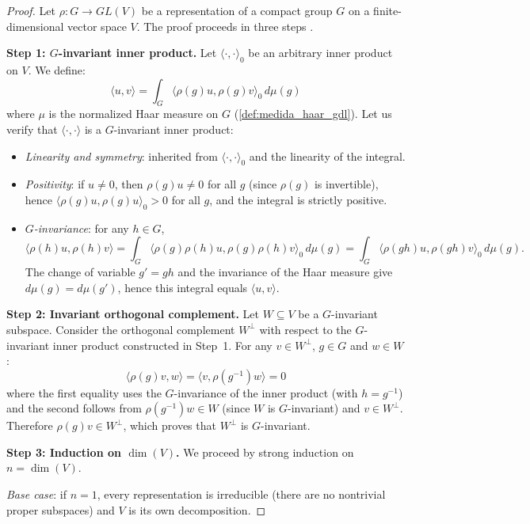 \begin{proof}
Let $\rho: G \rightarrow GL(V)$ be a representation of a compact group $G$ on a finite-dimensional vector space $V$. The proof proceeds in three steps \citep{Fulton1991}.

\textbf{Step 1: $G$-invariant inner product.}
Let $\langle \cdot, \cdot \rangle_0$ be an arbitrary inner product on $V$. We define:
\begin{equation}\label{eq:producto_invariante}
\langle u, v \rangle = \int_G \langle \rho(g)u, \rho(g)v \rangle_0 \, d\mu(g)
\end{equation}
where $\mu$ is the normalized Haar measure on $G$ (\autoref{def:medida_haar_gdl}). Let us verify that $\langle \cdot, \cdot \rangle$ is a $G$-invariant inner product:
\begin{itemize}
    \item \textit{Linearity and symmetry}: inherited from $\langle \cdot, \cdot \rangle_0$ and the linearity of the integral.
    \item \textit{Positivity}: if $u \neq 0$, then $\rho(g)u \neq 0$ for all $g$ (since $\rho(g)$ is invertible), hence $\langle \rho(g)u, \rho(g)u \rangle_0 > 0$ for all $g$, and the integral is strictly positive.
    \item \textit{$G$-invariance}: for any $h \in G$,
    \[
    \langle \rho(h)u, \rho(h)v \rangle = \int_G \langle \rho(g)\rho(h)u, \rho(g)\rho(h)v \rangle_0 \, d\mu(g) = \int_G \langle \rho(gh)u, \rho(gh)v \rangle_0 \, d\mu(g).
    \]
    The change of variable $g' = gh$ and the invariance of the Haar measure give $d\mu(g) = d\mu(g')$, hence this integral equals $\langle u, v \rangle$.
\end{itemize}

\textbf{Step 2: Invariant orthogonal complement.}
Let $W \subseteq V$ be a $G$-invariant subspace. Consider the orthogonal complement $W^\perp$ with respect to the $G$-invariant inner product constructed in Step~1. For any $v \in W^\perp$, $g \in G$ and $w \in W$:
\[
\langle \rho(g)v, w \rangle = \langle v, \rho(g^{-1})w \rangle = 0
\]
where the first equality uses the $G$-invariance of the inner product (with $h = g^{-1}$) and the second follows from $\rho(g^{-1})w \in W$ (since $W$ is $G$-invariant) and $v \in W^\perp$. Therefore $\rho(g)v \in W^\perp$, which proves that $W^\perp$ is $G$-invariant.

\textbf{Step 3: Induction on $\dim(V)$.}
We proceed by strong induction on $n = \dim(V)$.

\textit{Base case}: if $n = 1$, every representation is irreducible (there are no nontrivial proper subspaces) and $V$ is its own decomposition.


\end{proof}
